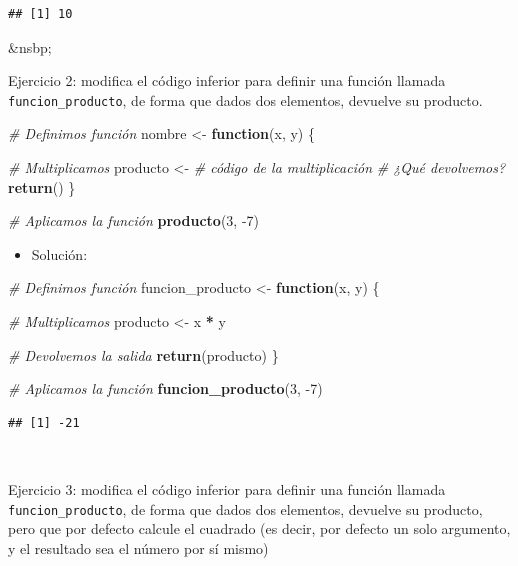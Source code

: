 \documentclass[11pt,]{book}
\newenvironment{Shaded}{\begin{snugshade}}{\end{snugshade}}
\newcommand{\CommentTok}[1]{\textcolor[rgb]{0.37,0.37,0.37}{\textit{#1}}}
\newcommand{\ControlFlowTok}[1]{\textcolor[rgb]{0.27,0.27,0.27}{\textbf{#1}}}
\newcommand{\DecValTok}[1]{\textcolor[rgb]{0.06,0.06,0.06}{#1}}
\newcommand{\KeywordTok}[1]{\textcolor[rgb]{0.27,0.27,0.27}{\textbf{#1}}}
\newcommand{\NormalTok}[1]{#1}
\newcommand{\OperatorTok}[1]{\textcolor[rgb]{0.43,0.43,0.43}{\textbf{#1}}}
\newcommand{\StringTok}[1]{\textcolor[rgb]{0.5,0.5,0.5}{#1}}
\providecommand{\tightlist}{%
  \setlength{\itemsep}{0pt}\setlength{\parskip}{0pt}}
\begin{document}
\begin{verbatim}
## [1] 10
\end{verbatim}

\&nsbp;

Ejercicio 2: modifica el código inferior para definir una función llamada \texttt{funcion\_producto}, de forma que dados dos elementos, devuelve su producto.

\begin{Shaded}
\begin{Highlighting}[]
\CommentTok{# Definimos función}
\NormalTok{nombre <-}\StringTok{ }\ControlFlowTok{function}\NormalTok{(x, y) \{}
  
  \CommentTok{# Multiplicamos}
\NormalTok{  producto <-}\StringTok{ }\CommentTok{# código de la multiplicación}
\StringTok{  }
\StringTok{  }\CommentTok{# ¿Qué devolvemos?}
\StringTok{  }\KeywordTok{return}\NormalTok{()}
\NormalTok{\}}

\CommentTok{# Aplicamos la función}
\KeywordTok{producto}\NormalTok{(}\DecValTok{3}\NormalTok{, }\DecValTok{-7}\NormalTok{)}
\end{Highlighting}
\end{Shaded}

\begin{itemize}
\tightlist
\item
  Solución:
\end{itemize}

\begin{Shaded}
\begin{Highlighting}[]
\CommentTok{# Definimos función}
\NormalTok{funcion_producto <-}\StringTok{ }\ControlFlowTok{function}\NormalTok{(x, y) \{}
  
  \CommentTok{# Multiplicamos}
\NormalTok{  producto <-}\StringTok{ }\NormalTok{x }\OperatorTok{*}\StringTok{ }\NormalTok{y}
  
  \CommentTok{# Devolvemos la salida}
  \KeywordTok{return}\NormalTok{(producto)}
\NormalTok{\}}

\CommentTok{# Aplicamos la función}
\KeywordTok{funcion_producto}\NormalTok{(}\DecValTok{3}\NormalTok{, }\DecValTok{-7}\NormalTok{)}
\end{Highlighting}
\end{Shaded}

\begin{verbatim}
## [1] -21
\end{verbatim}

~

Ejercicio 3: modifica el código inferior para definir una función llamada \texttt{funcion\_producto}, de forma que dados dos elementos, devuelve su producto, pero que por defecto calcule el cuadrado (es decir, por defecto un solo argumento, y el resultado sea el número por sí mismo)
\end{document}
